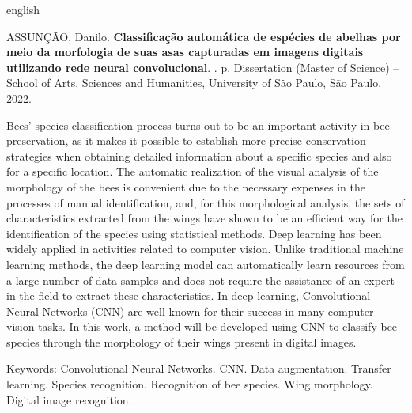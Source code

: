 \documentclass[
	12pt,				%
	oneside,			%
	a4paper,			%
	english,			%
	brazil				%
	]{abntex2ppgsi}
\begin{document}
% 
% 
\begin{resumo}[Abstract]
\begin{otherlanguage*}{english}

% 
%
%
%
\begin{flushleft}
ASSUNÇÃO, Danilo. \textbf{Classificação automática de espécies de abelhas por meio da morfologia de suas asas capturadas em imagens digitais utilizando rede neural convolucional}. \imprimirdata. \pageref{LastPage} p. Dissertation (Master of Science) – School of Arts, Sciences and Humanities, University of São Paulo, São Paulo, 2022.
\end{flushleft}

Bees' species classification process turns out to be an important activity in bee preservation, as it makes it possible to establish more precise conservation strategies when obtaining detailed information about a specific species and also for a specific location. The automatic realization of the visual analysis of the morphology of the bees is convenient due to the necessary expenses in the processes of manual identification, and, for this morphological analysis, the sets of characteristics extracted from the wings have shown to be an efficient way for the identification of the species using statistical methods. Deep learning has been widely applied in activities related to computer vision. Unlike traditional machine learning methods, the deep learning model can automatically learn resources from a large number of data samples and does not require the assistance of an expert in the field to extract these characteristics. In deep learning, Convolutional Neural Networks (CNN) are well known for their success in many computer vision tasks. In this work, a method will be developed using CNN to classify bee species through the morphology of their wings present in digital images.

Keywords: Convolutional Neural Networks. CNN. Data augmentation. Transfer learning. Species recognition. Recognition of bee species. Wing morphology. Digital image recognition.
\end{otherlanguage*}
\end{resumo}
\end{document}
